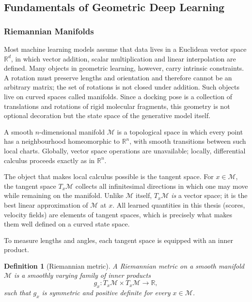 \documentclass[a4paper,12pt]{article}
\newtheorem{definition}[theorem]{Definition}
\theoremstyle{remark}
\begin{document}
\subsection{Fundamentals of Geometric Deep Learning}
\label{sec:geom}

\subsubsection{Riemannian Manifolds}
\label{sec:manifolds}

Most machine learning models assume that data lives in a Euclidean vector space
$\mathbb R^d$, in which vector addition, scalar multiplication and linear
interpolation are defined. Many objects in geometric learning, however, carry
intrinsic constraints. A rotation must preserve lengths and orientation and therefore
cannot be an arbitrary matrix; the set of rotations is not closed under addition. Such
objects live on curved spaces called manifolds. Since a docking pose is a collection of
translations and rotations of rigid molecular fragments, this geometry is not optional
decoration but the state space of the generative model itself.

A smooth $n$-dimensional manifold $\mathcal M$ is a topological space in which every
point has a neighbourhood homeomorphic to $\mathbb R^n$, with smooth transitions
between such local charts. Globally, vector space operations are unavailable; locally,
differential calculus proceeds exactly as in $\mathbb R^n$.

The object that makes local calculus possible is the tangent space. For $x\in\mathcal M$,
the tangent space $T_x\mathcal M$ collects all infinitesimal directions in which one may
move while remaining on the manifold. Unlike $\mathcal M$ itself, $T_x\mathcal M$ \emph{is}
a vector space; it is the best linear approximation of $\mathcal M$ at $x$. All learned
quantities in this thesis (scores, velocity fields) are elements of tangent spaces,
which is precisely what makes them well defined on a curved state space.

To measure lengths and angles, each tangent space is equipped with an inner product.

\begin{definition}[Riemannian metric]
\label{def:metric}
A \emph{Riemannian metric} on a smooth manifold $\mathcal M$ is a smoothly varying
family of inner products
\[
g_x:T_x\mathcal M\times T_x\mathcal M\rightarrow\mathbb R,
\]
such that $g_x$ is symmetric and positive definite for every $x\in\mathcal M$.
\end{definition}
\end{document}
